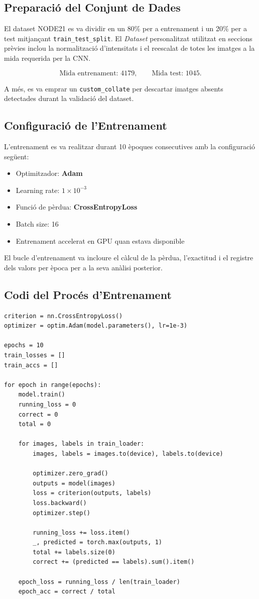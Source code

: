 \documentclass[12pt,a4paper]{article}
\begin{document}
\subsection{Preparació del Conjunt de Dades}

El dataset NODE21 es va dividir en un 80\% per a entrenament i un 20\% per a test mitjançant
\texttt{train\_test\_split}. El \textit{Dataset} personalitzat utilitzat en seccions
prèvies inclou la normalització d’intensitats i el reescalat de totes les imatges a la
mida requerida per la CNN.

\[
\text{Mida entrenament: } 4179, \qquad
\text{Mida test: } 1045.
\]

A més, es va emprar un \texttt{custom\_collate} per descartar imatges absents detectades
durant la validació del dataset.

\subsection{Configuració de l’Entrenament}

L’entrenament es va realitzar durant 10 èpoques consecutives amb la configuració següent:

\begin{itemize}
    \item Optimitzador: \textbf{Adam}
    \item Learning rate: $1 \times 10^{-3}$
    \item Funció de pèrdua: \textbf{CrossEntropyLoss}
    \item Batch size: 16
    \item Entrenament accelerat en GPU quan estava disponible
\end{itemize}

El bucle d’entrenament va incloure el càlcul de la pèrdua, l’exactitud i el registre dels
valors per època per a la seva anàlisi posterior.

\subsection{Codi del Procés d’Entrenament}

\begin{lstlisting}[style=mypython]
criterion = nn.CrossEntropyLoss()
optimizer = optim.Adam(model.parameters(), lr=1e-3)

epochs = 10
train_losses = []
train_accs = []

for epoch in range(epochs):
    model.train()
    running_loss = 0
    correct = 0
    total = 0

    for images, labels in train_loader:
        images, labels = images.to(device), labels.to(device)

        optimizer.zero_grad()
        outputs = model(images)
        loss = criterion(outputs, labels)
        loss.backward()
        optimizer.step()

        running_loss += loss.item()
        _, predicted = torch.max(outputs, 1)
        total += labels.size(0)
        correct += (predicted == labels).sum().item()

    epoch_loss = running_loss / len(train_loader)
    epoch_acc = correct / total
\end{lstlisting}
\end{document}
